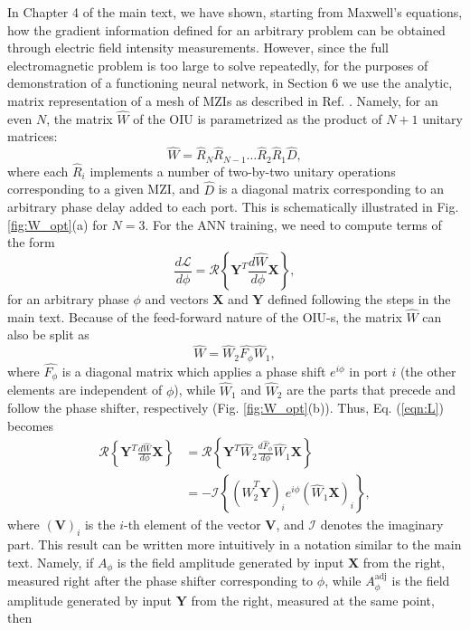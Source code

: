 In Chapter 4 of the main text, we have shown, starting from Maxwell's equations, how the gradient information defined for an arbitrary problem can be obtained through electric field intensity measurements. However, since the full electromagnetic problem is too large to solve repeatedly, for the purposes of demonstration of a functioning neural network, in Section 6 we use the analytic, matrix representation of a mesh of MZIs as described in Ref. \cite{Clements2016}. Namely, for an even $N$, the matrix $\hat{W}$ of the OIU is parametrized as the product of $N + 1$ unitary matrices:
%
\begin{equation}
\hat{W} = \hat{R}_N \hat{R}_{N-1} \dots \hat{R}_2 \hat{R}_1 \hat{D} ,
\label{eq:W_R}
\end{equation}
%
where each $\hat{R}_i$ implements a number of two-by-two unitary operations corresponding to a given MZI, and $\hat{D}$ is a diagonal matrix corresponding to an arbitrary phase delay added to each port. This is schematically illustrated in Fig. \ref{fig:W_opt}(a) for $N = 3$. For the ANN training, we need to compute terms of the form 
%
\begin{equation}
\frac{d\mathcal{L}}{d\phi} =
\mathcal{R}\left\{ \mathbf{Y}^T \frac{d \hat{W}}{d\phi} \mathbf{X} \right\},
\label{eqn:L}
\end{equation}
%
for an arbitrary phase $\phi$ and vectors $\mathbf{X}$ and $\mathbf{Y}$ defined following the steps in the main text. Because of the feed-forward nature of the OIU-s, the matrix $\hat{W}$ can also be split as
%
\begin{equation}
\hat{W} = \hat{W}_2 \hat{F_\phi} \hat{W}_1,
\end{equation}
%
where $\hat{F_\phi}$ is a diagonal matrix which applies a phase shift $e^{i\phi}$ in port $i$ (the other elements are independent of $\phi$), while $\hat{W}_1$ and $\hat{W}_2$ are the parts that precede and follow the phase shifter, respectively (Fig. \ref{fig:W_opt}(b)). Thus, Eq. (\ref{eqn:L}) becomes 
%
\begin{align}
\mathcal{R}\left\{ \mathbf{Y}^T \frac{d \hat{W}}{d\phi} \mathbf{X} \right\} &= \mathcal{R}\left\{ \mathbf{Y}^T \hat{W}_2 \frac{d\hat{F}_\phi}{d \phi} \hat{W}_1 \mathbf{X} \right\} \label{eqn:XY}
\\ \nonumber
& = -\mathcal{I}\left\{(\hat{W}_2^T \mathbf{Y})_i e^{i\phi} (\hat{W}_1 \mathbf{X})_i \right\},
\end{align}
%
where $(\mathbf{V})_i$ is the $i$-th element of the vector $\mathbf{V}$, and $\mathcal{I}$ denotes the imaginary part. This result can be written more intuitively in a notation similar to the main text. Namely, if $A_\phi$ is the field amplitude generated by input $\mathbf{X}$ from the right, measured right after the phase shifter corresponding to $\phi$, while $A^{\mathrm{adj}}_\phi$ is the field amplitude generated by input $\mathbf{Y}$ from the right, measured at the same point, then
